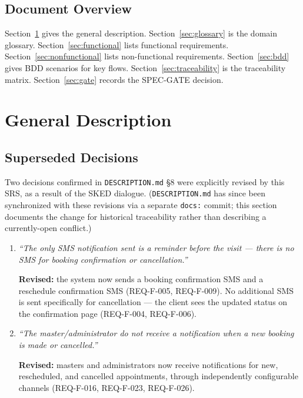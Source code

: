 \documentclass[11pt,a4paper]{article}
\begin{document}
\subsection{Document Overview}

Section~\ref{sec:general} gives the general description.
Section~\ref{sec:glossary} is the domain glossary.
Section~\ref{sec:functional} lists functional requirements.
Section~\ref{sec:nonfunctional} lists non-functional requirements.
Section~\ref{sec:bdd} gives BDD scenarios for key flows.
Section~\ref{sec:traceability} is the traceability matrix.
Section~\ref{sec:gate} records the SPEC-GATE decision.

\section{General Description}
\label{sec:general}

\subsection{Superseded Decisions}
\label{sec:superseded}

Two decisions confirmed in \texttt{DESCRIPTION.md} \S8 were explicitly
revised by this SRS, as a result of the SKED dialogue.
(\texttt{DESCRIPTION.md} has since been synchronized with these revisions
via a separate \texttt{docs:} commit; this section documents the change
for historical traceability rather than describing a currently-open
conflict.)

\begin{enumerate}[leftmargin=1.2cm]

\item
\emph{``The only SMS notification sent is a reminder before the visit ---
there is no SMS for booking confirmation or cancellation.''}

\textbf{Revised:}
the system now sends a booking confirmation SMS and a reschedule
confirmation SMS (REQ-F-005, REQ-F-009). No additional SMS is sent
specifically for cancellation --- the client sees the updated status on
the confirmation page (REQ-F-004, REQ-F-006).

\item
\emph{``The master/administrator do not receive a notification when a new
booking is made or cancelled.''}

\textbf{Revised:}
masters and administrators now receive notifications for new, rescheduled,
and cancelled appointments, through independently configurable channels
(REQ-F-016, REQ-F-023, REQ-F-026).

\end{enumerate}
\end{document}
